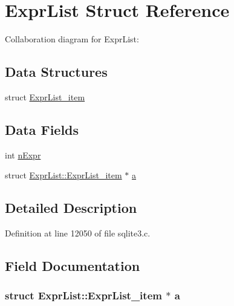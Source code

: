 \hypertarget{struct_expr_list}{}\section{Expr\+List Struct Reference}
\label{struct_expr_list}


Collaboration diagram for Expr\+List\+:
\subsection*{Data Structures}
\begin{DoxyCompactItemize}
\item 
struct \hyperlink{struct_expr_list_1_1_expr_list__item}{Expr\+List\+\_\+item}
\end{DoxyCompactItemize}
\subsection*{Data Fields}
\begin{DoxyCompactItemize}
\item 
int \hyperlink{struct_expr_list_a1ca01ae801531fe9c5245a9e551b182b}{n\+Expr}
\item 
struct \hyperlink{struct_expr_list_1_1_expr_list__item}{Expr\+List\+::\+Expr\+List\+\_\+item} $\ast$ \hyperlink{struct_expr_list_a49753dce3420953525d269966add96f3}{a}
\end{DoxyCompactItemize}


\subsection{Detailed Description}


Definition at line 12050 of file sqlite3.\+c.



\subsection{Field Documentation}
\hypertarget{struct_expr_list_a49753dce3420953525d269966add96f3}{}
\subsubsection[{a}]{\setlength{\rightskip}{0pt plus 5cm}struct {\bf Expr\+List\+::\+Expr\+List\+\_\+item} $\ast$ a}\label{struct_expr_list_a49753dce3420953525d269966add96f3}
\hypertarget{struct_expr_list_a1ca01ae801531fe9c5245a9e551b182b}{}
